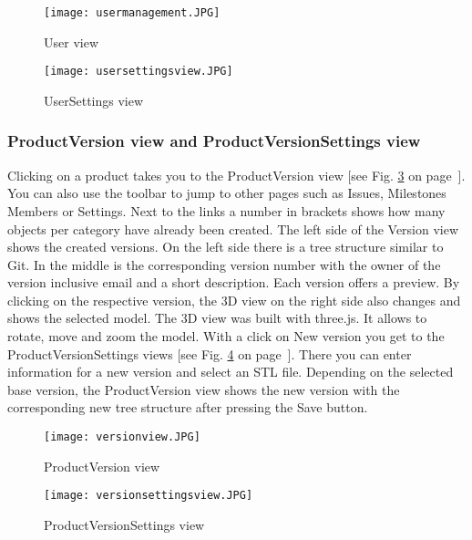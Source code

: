     \begin{figure}[h]
        \centering
        \texttt{[image: usermanagement.JPG]}
        \caption{User view}
        \label{fig: usermanagement}
    \end{figure}

    \begin{figure}[h]
        \centering
        \texttt{[image: usersettingsview.JPG]}
        \caption{UserSettings view}
        \label{fig: usersettingsview}
    \end{figure}

    \subsubsection*{ProductVersion view and ProductVersionSettings view}
    Clicking on a product takes you to the ProductVersion view [see Fig. \ref{fig: versionview} on page~\pageref{fig: versionview}]. You can also use the toolbar to jump to other pages such as Issues, Milestones Members or Settings. Next to the links a number in brackets shows how many objects per category have already been created. The left side of the Version view shows the created versions. On the left side there is a tree structure similar to Git. In the middle is the corresponding version number with the owner of the version inclusive email and a short description. Each version offers a preview. By clicking on the respective version, the 3D view on the right side also changes and shows the selected model. The 3D view was built with three.js. It allows to rotate, move and zoom the model. With a click on New version you get to the ProductVersionSettings views [see Fig. \ref{fig: versionsettingsview} on page~\pageref{fig: versionsettingsview}]. There you can enter information for a new version and select an STL file. Depending on the selected base version, the ProductVersion view shows the new version with the corresponding new tree structure after pressing the Save button.
    
    \begin{figure}[h]
        \centering
        \texttt{[image: versionview.JPG]}
        \caption{ProductVersion view}
        \label{fig: versionview}
    \end{figure}

    \begin{figure}[h]
        \centering
        \texttt{[image: versionsettingsview.JPG]}
        \caption{ProductVersionSettings view}
        \label{fig: versionsettingsview}
    \end{figure}

